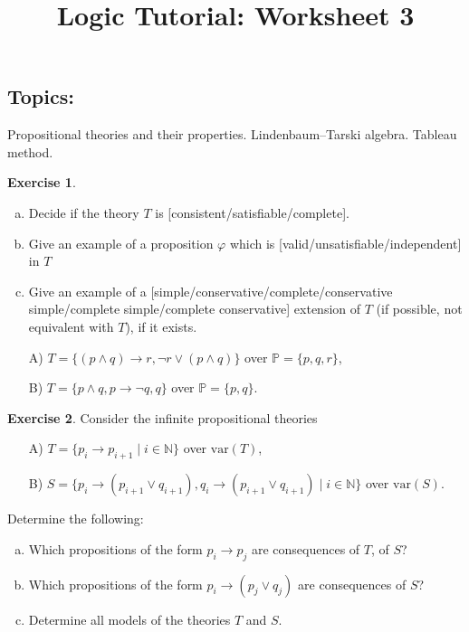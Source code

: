 \documentclass{amsart}
\title{\sc Logic Tutorial: Worksheet 3}
\date{}
\theoremstyle{definition}
\newtheorem{problem}{Exercise}
\begin{document}
\maketitle
\vspace{-0.5cm}

\subsection*{Topics:}  Propositional theories and their properties. Lindenbaum--Tarski algebra. Tableau method.
\thispagestyle{empty}

\smallskip



\begin{problem}
\begin{enumerate}[(a)]
\item Decide if the theory $T$ is [consistent/satisfiable/complete].
\item Give an example of a proposition $\varphi$ which is [valid/unsatisfiable/independent] in $T$
\item Give an example of a [simple/conservative/complete/conservative simple/complete simple/complete conservative] extension of $T$ (if possible, not equivalent with $T$), if it exists.
\end{enumerate}
\begin{enumerate}
    \item[A)] $T=\{(p\wedge q)\to r, \neg r\vee(p\wedge q)\}$ over $\mathbb P=\{p,q,r\}$,
    \item[B)] $T=\{p\wedge q,p\to\neg q,q\}$ over $\mathbb P=\{p,q\}$.
\end{enumerate}
\end{problem}



\begin{problem}
Consider the infinite propositional theories
\begin{enumerate}
    \item[A)] $T=\{p_i \to p_{i+1}\mid i\in \mathbb{N}\}$ over $\mathrm{var}(T)$,
    \item[B)] $S=\{p_i \to (p_{i+1} \vee q_{i+1}), q_i \to (p_{i+1} \vee q_{i+1}) \mid i\in \mathbb{N}\}$ over $\mathrm{var}(S)$.
\end{enumerate}
Determine the following:
\begin{enumerate}[(a)]
\item Which propositions of the form  $p_i \to p_j$ are consequences of $T$, of $S$?
\item Which propositions of the form  $p_i \to (p_j \vee q_j)$ are consequences of $S$?
\item Determine all models of the theories $T$ and $S$.
\end{enumerate}
\end{problem}
\end{document}
